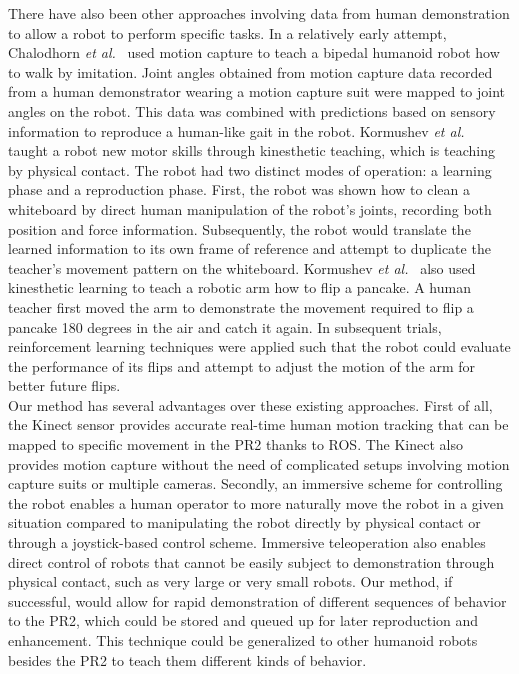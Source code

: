 \documentclass{sig-alternate}
\begin{document}
\indent There have also been other approaches involving data from human demonstration to allow a robot to perform specific tasks. In a relatively early attempt, Chalodhorn \textit{et al.}~\cite{walk_imitation} used motion capture to teach a bipedal humanoid robot how to walk by imitation. Joint angles obtained from motion capture data recorded from a human demonstrator wearing a motion capture suit were mapped to joint angles on the robot. This data was combined with predictions based on sensory information to reproduce a human-like gait in the robot. Kormushev \textit{et al.}~\cite{whiteboard} taught a robot new motor skills through kinesthetic teaching, which is teaching by physical contact. The robot had two distinct modes of operation: a learning phase and a reproduction phase. First, the robot was shown how to clean a whiteboard by direct human manipulation of the robot's joints, recording both position and force information. Subsequently, the robot would translate the learned information to its own frame of reference and attempt to duplicate the teacher's movement pattern on the whiteboard.  Kormushev \textit{et al.}~\cite{pancakes} also used kinesthetic learning to teach a robotic arm how to flip a pancake. A human teacher first moved the arm to demonstrate the movement required to flip a pancake 180 degrees in the air and catch it again. In subsequent trials, reinforcement learning techniques were applied such that the robot could evaluate the performance of its flips and attempt to adjust the motion of the arm for better future flips.\\
\indent Our method has several advantages over these existing approaches. First of all, the Kinect sensor provides accurate real-time human
motion tracking that can be mapped to specific movement in the PR2 thanks to ROS. The Kinect also provides motion capture without the need
of complicated setups involving motion capture suits or multiple cameras. Secondly, an immersive scheme for controlling the robot
enables a human operator to more naturally move the robot in a given situation compared to manipulating the robot directly by physical
contact or through a joystick-based control scheme. Immersive teleoperation also enables direct control of robots that cannot be easily
subject to demonstration through physical contact, such as very large or very small robots. Our method, if successful, would allow for rapid demonstration of different sequences of behavior to the PR2, which could be stored and queued up for later reproduction and enhancement. This technique could be generalized to other humanoid robots besides the PR2 to teach them different kinds of behavior.
\end{document}

